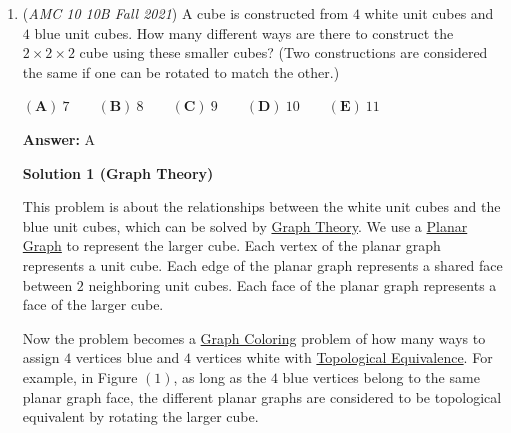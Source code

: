 \begin{enumerate}
 If you draw the five exterior sides with two colored in one color and the other three colored in a different color, you will see, that there are absolutely no ways to color the interior diagonals such that no triangle with all three sides the same color exists. This subcase yields $0$ ways.

 Subcase $2$: The case in which the two exterior sides colored differently from the other three are separated by another exterior side. There are $5$ arrangements for the exterior (draw and see for yourself) and the colors can be swapped with each other and since each of the exterior configurations force a particular interior configuration, this yields $2 \cdot 5=10$ ways. 

 In total, there are $10+2=12$ ways, such that no triangle has all three sides in the same color. This yields $1024-12=1012$ ways such that there is a triangle such that it has all three sides in the same color. Thus, the probability is: $\frac{1012}{2^{10}} = \boxed{(\textbf{D}) \frac{253}{256}}$~Shiva Kannan

 


	\item (\textit{AMC 10 10B Fall 2021}) A cube is constructed from $4$ white unit cubes and $4$ blue unit cubes. How many different ways are there to construct the $2 \times 2 \times 2$ cube using these smaller cubes? (Two constructions are considered the same if one can be rotated to match the other.)


 $(\textbf{A})\: 7\qquad(\textbf{B}) \: 8\qquad(\textbf{C}) \: 9\qquad(\textbf{D}) \: 10\qquad(\textbf{E}) \: 11$

 \textbf{Answer: }A



\textbf{Solution 1 (Graph Theory)}

This problem is about the relationships between the white unit cubes and the blue unit cubes, which can be solved by \href{https://en.wikipedia.org/wiki/Graph\_theory}{Graph Theory}. We use a \href{https://en.wikipedia.org/wiki/Planar\_graph}{Planar Graph} to represent the larger cube. Each vertex of the planar graph represents a unit cube. Each edge of the planar graph represents a shared face between $2$ neighboring unit cubes. Each face of the planar graph represents a face of the larger cube.

 Now the problem becomes a \href{https://en.wikipedia.org/wiki/Graph\_coloring}{Graph Coloring} problem of how many ways to assign $4$ vertices blue and $4$ vertices white with \href{https://en.wikipedia.org/wiki/Homeomorphism}{Topological Equivalence}. For example, in Figure $(1)$, as long as the $4$ blue vertices belong to the same planar graph face, the different planar graphs are considered to be topological equivalent by rotating the larger cube.


\end{enumerate}
